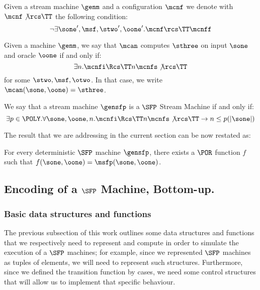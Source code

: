 \begin{notation}
Given a stream machine $\genm$ and a configuration $\mcnf$ we denote with $\mcnf\not\rcs\TT$ the following condition:
\[
\lnot \exists \sone', \msf, \stwo',\oone'. \mcnf \rcs\TT \mcnff
\]
\end{notation}

\begin{defn}
Given a machine $\genm$, we say that $\mcan$ computes $\sthree$ on input $\sone$ and oracle $\oone$ if and only if:
\[
\exists n. \mcnfi \Rcs\TT n \mcnfs \not\rcs\TT
\]
for some $\stwo, \msf, \otwo$. In that case, we write $\mcan(\sone, \oone)=\sthree$.
\end{defn}

\begin{defn}
We say that a stream machine $\gensfp$ is a $\SFP$ Stream Machine if and only if:
\[
\exists p \in \POLY.\forall \sone, \oone, n. \mcnfi \Rcs\TT n \mcnfs \not\rcs\TT \to n \le p(|\sone|)
\]
\end{defn}

The result that we are addressing in the current section can be now restated as:

\begin{lemma}
\label{lemma:smtopor}
For every deterministic $\SFP$ machine $\gensfp$, there exists a $\POR$ function $f$ such that $f(\sone, \oone)=\msfp(\sone, \oone)$.
\end{lemma}

\subsection{Encoding of a $\SFP$ Machine, Bottom-up.}
\label{sec:encoding}
\subsubsection{Basic data structures and functions}
\label{sec:basicdataandfun}

The previous subsection of this work outlines some data structures and functions that we respectively need to represent and compute in order to simulate the execution of a $\SFP$ machines; for example, since we represented $\SFP$ machines as tuples of elements, we will need to represent such structures. Furthermore, since we defined the transition function by cases, we need some control structures that will allow us to implement that specific behaviour.

